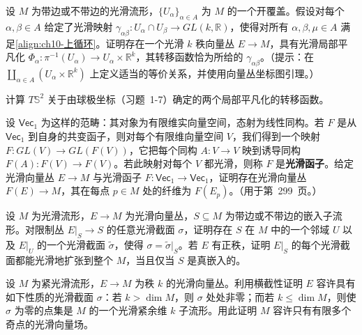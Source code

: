 \documentclass[../../main.tex]{subfiles}
\begin{document}
\begin{exercise}[向量丛构造定理]\label{exercise:ch10-06}
设 $M$ 为带边或不带边的光滑流形，$\{U_\alpha\}_{\alpha\in A}$ 为 $M$ 的一个开覆盖。假设对每个 $\alpha,\beta\in A$ 给定了光滑映射 $\gamma_{\alpha\beta}\colon U_\alpha\cap U_\beta\to GL(k,\mathbb{R})$，使得对所有 $\alpha,\beta,\mu\in A$ 满足\eqref{align:ch10-上循环}。证明存在一个光滑 $k$ 秩向量丛 $E\to M$，具有光滑局部平凡化 $\Phi_\alpha\colon\pi^{-1}(U_\alpha)\to U_\alpha\times\mathbb{R}^k$，其转移函数恰为所给的 $\gamma_{\alpha\beta}$。（提示：在 $\coprod_{\alpha\in A}(U_\alpha\times\mathbb{R}^k)$ 上定义适当的等价关系，并使用向量丛坐标图引理。）
\end{exercise}

\begin{exercise}\label{exercise:ch10-07}
计算 $T\mathbb{S}^2$ 关于由球极坐标（习题~1-7）确定的两个局部平凡化的转移函数。
\end{exercise}

\begin{exercise}\label{exercise:ch10-08}
设 $\mathsf{Vec}_1$ 为这样的范畴：其对象为有限维实向量空间，态射为线性同构。若 $F$ 是从 $\mathsf{Vec}_1$ 到自身的共变函子，则对每个有限维向量空间 $V$，我们得到一个映射 $F\colon GL(V)\to GL(F(V))$，它把每个同构 $A\colon V\to V$ 映到诱导同构 $F(A)\colon F(V)\to F(V)$。若此映射对每个 $V$ 都光滑，则称 $F$ 是\textbf{光滑函子}。给定光滑向量丛 $E\to M$ 与光滑函子 $F\colon\mathsf{Vec}_1\to\mathsf{Vec}_1$，证明存在光滑向量丛 $F(E)\to M$，其在每点 $p\in M$ 处的纤维为 $F(E_p)$。（用于第~299~页。）
\end{exercise}

\begin{exercise}[限制丛截面的扩张引理]\label{exercise:ch10-09}
设 $M$ 为光滑流形，$E\to M$ 为光滑向量丛，$S\subseteq M$ 为带边或不带边的嵌入子流形。对限制丛 $E|_S\to S$ 的任意光滑截面 $\sigma$，证明存在 $S$ 在 $M$ 中的一个邻域 $U$ 以及 $E|_U$ 的一个光滑截面 $\widetilde\sigma$，使得 $\sigma=\widetilde\sigma|_S$。若 $E$ 有正秩，证明 $E|_S$ 的每个光滑截面都能光滑地扩张到整个 $M$，当且仅当 $S$ 是真嵌入的。
\end{exercise}

\begin{exercise}\label{exercise:ch10-10}
设 $M$ 为紧光滑流形，$E\to M$ 为秩 $k$ 的光滑向量丛。利用横截性证明 $E$ 容许具有如下性质的光滑截面 $\sigma$：若 $k>\dim M$，则 $\sigma$ 处处非零；而若 $k\leqslant\dim M$，则使 $\sigma$ 为零的点集是 $M$ 的一个光滑紧余维 $k$ 子流形。用此证明 $M$ 容许只有有限多个奇点的光滑向量场。
\end{exercise}
\end{document}
